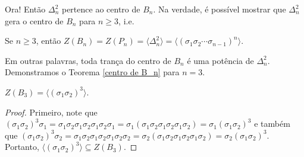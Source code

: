 	Ora! Então $\Delta_n^2$ pertence ao centro de $B_n$. Na verdade, é possível mostrar que $\Delta_n^2$ 
	gera o centro de $B_n$ para $n\geq 3$, i.e.
	\begin{theorem}
	\label{centro de B_n}
		Se $n\geq 3$, então $Z(B_n) = Z(P_n) = \langle \Delta_n^2 \rangle 
		= \langle (\sigma_1\sigma_2\cdots\sigma_{n-1})^n \rangle$.
	\end{theorem}
	Em outras palavras, toda trança do centro de $B_n$ é uma potência de $\Delta_n^2$.
	Demonstramos o Teorema \ref{centro de B_n} para $n=3$.
	\begin{prop}
		$Z(B_3) = \langle (\sigma_1\sigma_2)^3 \rangle$.
	\end{prop}
	\begin{proof}
		Primeiro, note que 
		$(\sigma_1\sigma_2)^3\sigma_1 = \sigma_1\sigma_2\sigma_1\sigma_2\sigma_1\sigma_2\sigma_1 
		= \sigma_1(\sigma_1\sigma_2\sigma_1\sigma_2\sigma_1\sigma_2) 
		= \sigma_1(\sigma_1\sigma_2)^3$ e também que 
		$(\sigma_1\sigma_2)^3\sigma_2 
		= \sigma_1\sigma_2\sigma_1\sigma_2\sigma_1\sigma_2\sigma_2 
		= \sigma_2(\sigma_1\sigma_2\sigma_1\sigma_2\sigma_1\sigma_2) 
		= \sigma_2(\sigma_1\sigma_2)^3$. Portanto, 
		$\langle (\sigma_1\sigma_2)^3 \rangle\subseteq Z(B_3)$.
		

\end{proof}
